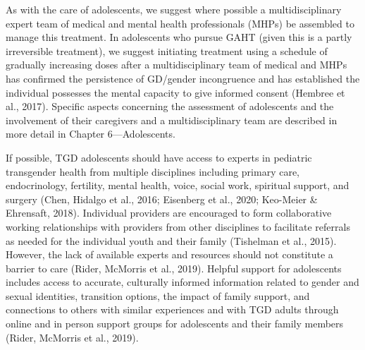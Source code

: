 \documentclass[
]{book}
\begin{document}
As with the care of adolescents, we suggest
where possible a multidisciplinary expert team
of medical and mental health professionals
(MHPs) be assembled to manage this treatment.
In adolescents who pursue GAHT (given this is
a partly irreversible treatment), we suggest initiating treatment using a schedule of gradually
increasing doses after a multidisciplinary team
of medical and MHPs has confirmed the persistence of GD/gender incongruence and has
established the individual possesses the mental
capacity to give informed consent (Hembree
et al., 2017). Specific aspects concerning the
assessment of adolescents and the involvement
of their caregivers and a multidisciplinary team
are described in more detail in Chapter
6---Adolescents.

If possible, TGD adolescents should have access
to experts in pediatric transgender health from
multiple disciplines including primary care, endocrinology, fertility, mental health, voice, social
work, spiritual support, and surgery (Chen,
Hidalgo et al., 2016; Eisenberg et al., 2020;
Keo-Meier \& Ehrensaft, 2018). Individual providers are encouraged to form collaborative working
relationships with providers from other disciplines to facilitate referrals as needed for the
individual youth and their family (Tishelman
et al., 2015). However, the lack of available
experts and resources should not constitute a
barrier to care (Rider, McMorris et al., 2019).
Helpful support for adolescents includes access
to accurate, culturally informed information
related to gender and sexual identities, transition
options, the impact of family support, and connections to others with similar experiences and
with TGD adults through online and in person
support groups for adolescents and their family
members (Rider, McMorris et al., 2019).
\end{document}
